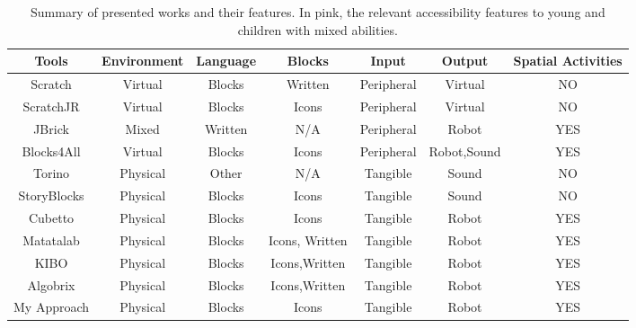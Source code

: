 \documentclass[oneside,%
                    author={Malak Hajji},
                    degree={BSc},
                    title={Designing An Accessible Computational Toolkit For Students},
                  subtitle={With Mixed Visual Abilities}]{dissertation}
\begin{document}
\FloatBarrier
\begin{table}[h]
\centering
\begin{tabular}{|c|c|c|c|c|c|c|}
\hline
Tools       & Environment   &Language             &Blocks     &Input      &Output     &Spatial Activities     \\ \hline
Scratch       &Virtual           & \textcolor{mypink}{Blocks}    &Written          &Peripheral         &Virtual          &NO \\ \hline
ScratchJR    &Virtual            & \textcolor{mypink}{Blocks}    &Icons         &Peripheral         &Virtual          &NO \\ \hline
JBrick &Mixed            &Written    &N/A         &Peripheral        &\textcolor{mypink}{Robot}         &\textcolor{mypink}{YES} \\ \hline
Blocks4All &Virtual            & \textcolor{mypink}{Blocks}    &\textcolor{mypink}{Icons}         &Peripheral         &\textcolor{mypink}{Robot},Sound          &\textcolor{mypink}{YES} \\ \hline
Torino &Physical            &Other    &N/A          &Tangible          &Sound          &NO \\ \hline
StoryBlocks &\textcolor{mypink}{Physical}           & \textcolor{mypink}{Blocks}    &\textcolor{mypink}{Icons}        &\textcolor{mypink}{Tangible}          &Sound          &NO \\ \hline
Cubetto &\textcolor{mypink}{Physical}           & \textcolor{mypink}{Blocks}    &\textcolor{mypink}{Icons}        &\textcolor{mypink}{Tangible}          &\textcolor{mypink}{Robot}         &\textcolor{mypink}{YES}\\ \hline
Matatalab   &\textcolor{mypink}{Physical}           & \textcolor{mypink}{Blocks}    &\textcolor{mypink}{Icons}, Written     &\textcolor{mypink}{Tangible}          &\textcolor{mypink}{Robot}         &\textcolor{mypink}{YES} \\ \hline
KIBO &\textcolor{mypink}{Physical}           & \textcolor{mypink}{Blocks}    &\textcolor{mypink}{Icons},Written      &\textcolor{mypink}{Tangible}          &\textcolor{mypink}{Robot}         &\textcolor{mypink}{YES}\\ \hline
Algobrix   &\textcolor{mypink}{Physical}           & \textcolor{mypink}{Blocks}    &\textcolor{mypink}{Icons},Written      &\textcolor{mypink}{Tangible}          &\textcolor{mypink}{Robot}         &\textcolor{mypink}{YES}\\ \hline
My Approach &\textcolor{mypink}{Physical}           & \textcolor{mypink}{Blocks}    &\textcolor{mypink}{Icons}    &\textcolor{mypink}{Tangible}          &\textcolor{mypink}{Robot}         &\textcolor{mypink}{YES}\\ \hline
\hline
\end{tabular}
\caption{Summary of presented works and their features. In pink, the relevant accessibility features to young and children with mixed abilities.}
\label{tab-final}
\end{table}
\FloatBarrier
\end{document}
